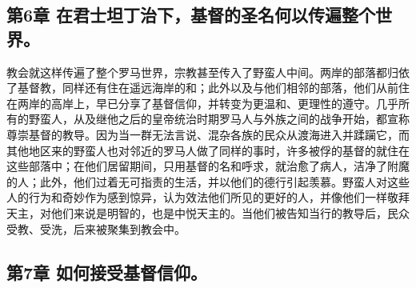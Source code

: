 
\subsection{第6章  在君士坦丁治下，基督的圣名何以传遍整个世界。}

教会就这样传遍了整个罗马世界，宗教甚至传入了野蛮人中间。两岸的部落都归依了基督教，同样还有住在遥远海岸的和；此外以及与他们相邻的部落，他们从前住在两岸的高岸上，早已分享了基督信仰，并转变为更温和、更理性的遵守。几乎所有的野蛮人，从及继他之后的皇帝统治时期罗马人与外族之间的战争开始，都宣称尊崇基督的教导。因为当一群无法言说、混杂各族的民众从渡海进入并蹂躏它，而其他地区来的野蛮人也对邻近的罗马人做了同样的事时，许多被俘的基督的就住在这些部落中；在他们居留期间，只用基督的名和呼求，就治愈了病人，洁净了附魔的人；此外，他们过着无可指责的生活，并以他们的德行引起羡慕。野蛮人对这些人的行为和奇妙作为感到惊异，认为效法他们所见的更好的人，并像他们一样敬拜天主，对他们来说是明智的，也是中悦天主的。当他们被告知当行的教导后，民众受教、受洗，后来被聚集到教会中。\par


\subsection{第7章  如何接受基督信仰。}

